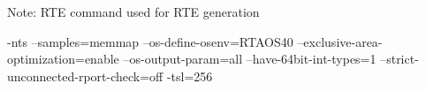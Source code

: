 Note: RTE command used for RTE generation

\begin{rtecommandline}
-nts --samples=memmap --os-define-osenv=RTAOS40 --exclusive-area-optimization=enable --os-output-param=all --have-64bit-int-types=1 --strict-unconnected-rport-check=off -tsl=256
\end{rtecommandline}

